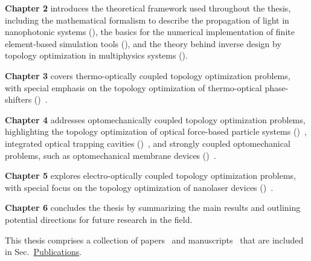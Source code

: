   \textbf{Chapter 2} introduces the theoretical framework used throughout the thesis, including the mathematical formalism
  to describe the propagation of light in nanophotonic systems (), the basics for the numerical implementation of 
  finite element-based simulation tools (), and the theory behind inverse design by topology optimization in multiphysics systems ().
  
  \textbf{Chapter 3} covers thermo-optically coupled topology optimization problems, with 
  special emphasis on the topology optimization of thermo-optical phase-shifters ()~\cite{ownpub0}.

  
  \textbf{Chapter 4} addresses optomechanically coupled topology optimization problems, highlighting the topology optimization of optical force-based particle systems ()~\cite{ownpub2}, integrated optical trapping cavities ()~\cite{ownpub1, ownpub3}, and strongly coupled optomechanical
  problems, such as optomechanical membrane devices ()~\cite{ownpub5}.
  
  \textbf{Chapter 5} explores electro-optically coupled topology optimization problems, with special focus on the topology optimization of 
  nanolaser devices ()~\cite{ownpub4}.
  
  \textbf{Chapter 6} concludes the thesis by summarizing the main results and outlining potential directions for future research in the field.

This thesis comprises a collection of papers~\cite{ownpub0, ownpub1, ownpub2, ownpub3} and manuscripts~\cite{ownpub4, ownpub5} that
are included in Sec.~\hyperref[sec:publications]{Publications}.